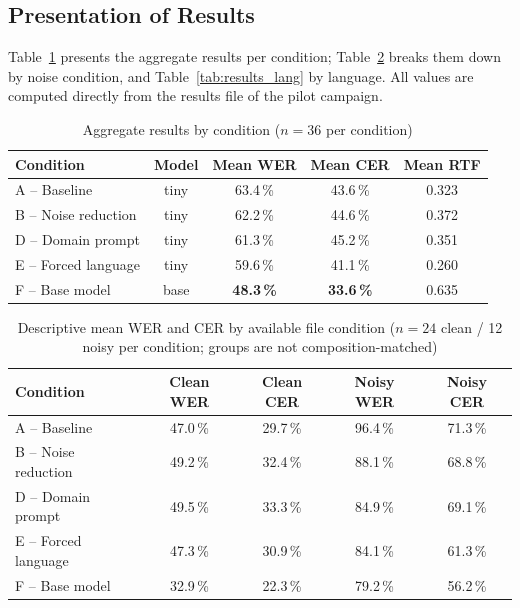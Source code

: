 \documentclass[12pt]{report}
\begin{document}
\subsection{Presentation of Results}
Table~\ref{tab:results_agg} presents the aggregate results per condition; Table~\ref{tab:results_noise} breaks them down by noise condition, and Table~\ref{tab:results_lang} by language. All values are computed directly from the results file of the pilot campaign.
\begin{table}[H]
\centering
\begin{tabular}{|l|c|c|c|c|}
\hline
\textbf{Condition} & \textbf{Model} & \textbf{Mean WER} & \textbf{Mean CER} & \textbf{Mean RTF} \\ \hline
A -- Baseline & tiny & 63.4\,\% & 43.6\,\% & 0.323 \\ \hline
B -- Noise reduction & tiny & 62.2\,\% & 44.6\,\% & 0.372 \\ \hline
D -- Domain prompt & tiny & 61.3\,\% & 45.2\,\% & 0.351 \\ \hline
E -- Forced language & tiny & 59.6\,\% & 41.1\,\% & 0.260 \\ \hline
F -- Base model & base & \textbf{48.3\,\%} & \textbf{33.6\,\%} & 0.635 \\ \hline
\end{tabular}
\caption{Aggregate results by condition ($n=36$ per condition)}
\label{tab:results_agg}
\end{table}
\begin{table}[H]
\centering
\begin{tabular}{|l|c|c|c|c|}
\hline
\textbf{Condition} & \textbf{Clean WER} & \textbf{Clean CER} & \textbf{Noisy WER} & \textbf{Noisy CER} \\ \hline
A -- Baseline & 47.0\,\% & 29.7\,\% & 96.4\,\% & 71.3\,\% \\ \hline
B -- Noise reduction & 49.2\,\% & 32.4\,\% & 88.1\,\% & 68.8\,\% \\ \hline
D -- Domain prompt & 49.5\,\% & 33.3\,\% & 84.9\,\% & 69.1\,\% \\ \hline
E -- Forced language & 47.3\,\% & 30.9\,\% & 84.1\,\% & 61.3\,\% \\ \hline
F -- Base model & 32.9\,\% & 22.3\,\% & 79.2\,\% & 56.2\,\% \\ \hline
\end{tabular}
\caption{Descriptive mean WER and CER by available file condition ($n=24$ clean / 12 noisy per condition; groups are not composition-matched)}
\label{tab:results_noise}
\end{table}
\end{document}
